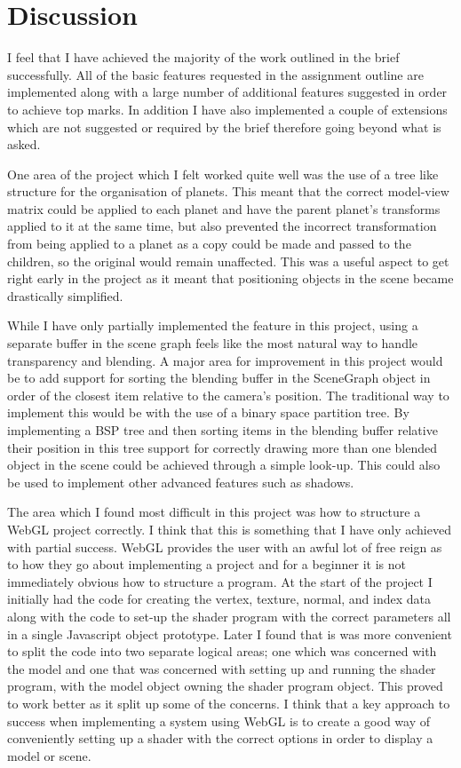 \documentclass[conference]{IEEEtran}
\begin{document}
\section{Discussion}
\label{sec:discussion}
I feel that I have achieved the majority of the work outlined in the brief successfully. All of the basic features requested in the assignment outline are implemented along with a large number of additional features suggested in order to achieve top marks. In addition I have also implemented a couple of extensions which are not suggested or required by the brief therefore going beyond what is asked.

One area of the project which I felt worked quite well was the use of a tree like structure for the organisation of planets. This meant that the correct model-view matrix could be applied to each planet and have the parent planet's transforms applied to it at the same time, but also prevented the incorrect transformation from being applied to a planet as a copy could be made and passed to the children, so the original would remain unaffected. This was a useful aspect to get right early in the project as it meant that positioning objects in the scene became drastically simplified.

While I have only partially implemented the feature in this project, using a separate buffer in the scene graph feels like the most natural way to handle transparency and blending. A major area for improvement in this project would be to add support for sorting the blending buffer in the SceneGraph object in order of the closest item relative to the camera's position. The traditional way to implement this would be with the use of a binary space partition tree. By implementing a BSP tree and then sorting items in the blending buffer relative their position in this tree support for correctly drawing more than one blended object in the scene could be achieved through a simple look-up. This could also be used to implement other advanced features such as shadows.

The area which I found most difficult in this project was how to structure a WebGL project correctly. I think that this is something that I have only achieved with partial success. WebGL provides the user with an awful lot of free reign as to how they go about implementing a project and for a beginner it is not immediately obvious how to structure a program. At the start of the project I initially had the code for creating the vertex, texture, normal, and index data along with the code to set-up the shader program with the correct parameters all in a single Javascript object prototype. Later I found that is was more convenient to split the code into two separate logical areas; one which was concerned with the model and one that was concerned with setting up and running the shader program, with the model object owning the shader program object. This proved to work better as it split up some of the concerns. I think that a key approach to success when implementing a system using WebGL is to create a good way of conveniently setting up a shader with the correct options in order to display a model or scene.
\end{document}
